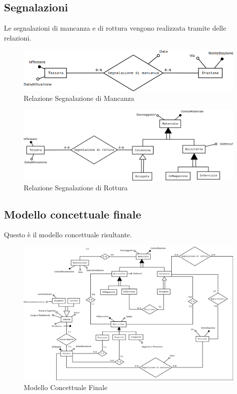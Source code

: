 \documentclass[a4paper,twoside]{article}
\begin{document}
\subsection{Segnalazioni}
Le segnalazioni di mancanza e di rottura vengono realizzata tramite delle relazioni.
\begin{figure}[H]
 \centering
  \includegraphics[width=1\textwidth]{Concettuale14}
\caption{Relazione Segnalazione di Mancanza}
\end{figure}
\begin{figure}[H]
 \centering
  \includegraphics[width=1\textwidth]{Concettuale15}
\caption{Relazione Segnalazione di Rottura}
\end{figure}
\newpage
\subsection{Modello concettuale finale}
Questo è il modello concettuale risultante.
\begin{figure}[H]
 \centering
  \includegraphics[width=1.35\textwidth,angle=90]{ConcettualeFinale}
\caption{Modello Concettuale Finale}
\end{figure}
\newpage
\end{document}
